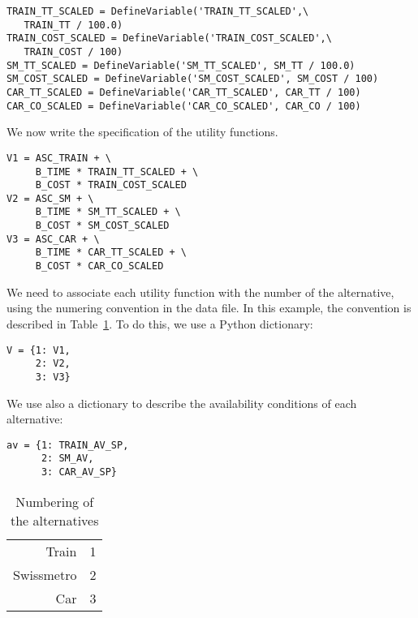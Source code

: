 \documentclass[12pt,a4paper]{article}
\begin{document}
\begin{lstlisting}[style=nonumbers]
TRAIN_TT_SCALED = DefineVariable('TRAIN_TT_SCALED',\
   TRAIN_TT / 100.0)
TRAIN_COST_SCALED = DefineVariable('TRAIN_COST_SCALED',\
   TRAIN_COST / 100)
SM_TT_SCALED = DefineVariable('SM_TT_SCALED', SM_TT / 100.0)
SM_COST_SCALED = DefineVariable('SM_COST_SCALED', SM_COST / 100)
CAR_TT_SCALED = DefineVariable('CAR_TT_SCALED', CAR_TT / 100)
CAR_CO_SCALED = DefineVariable('CAR_CO_SCALED', CAR_CO / 100)
\end{lstlisting}

We now write the specification of the
utility functions.

\begin{lstlisting}[style=nonumbers]
V1 = ASC_TRAIN + \
     B_TIME * TRAIN_TT_SCALED + \
     B_COST * TRAIN_COST_SCALED
V2 = ASC_SM + \
     B_TIME * SM_TT_SCALED + \
     B_COST * SM_COST_SCALED
V3 = ASC_CAR + \
     B_TIME * CAR_TT_SCALED + \
     B_COST * CAR_CO_SCALED
\end{lstlisting}

We need to associate each utility function with the number of the
alternative, using the numering convention in the data file. In this
example, the convention is described in Table~\ref{tab:choice}. To do
this, we use a Python dictionary:
\begin{lstlisting}[style=nonumbers]
V = {1: V1,
     2: V2,
     3: V3}
\end{lstlisting}
We use also a dictionary to describe the availability conditions of
each alternative:
\begin{lstlisting}[style=nonumbers]
av = {1: TRAIN_AV_SP,
      2: SM_AV,
      3: CAR_AV_SP}
\end{lstlisting}

\begin{table}[htb]
\begin{center}
\begin{tabular}{rl}
Train & 1 \\
Swissmetro & 2 \\
Car & 3
\end{tabular}
\end{center}
\caption{\label{tab:choice}Numbering of the alternatives}
\end{table}
\end{document}

